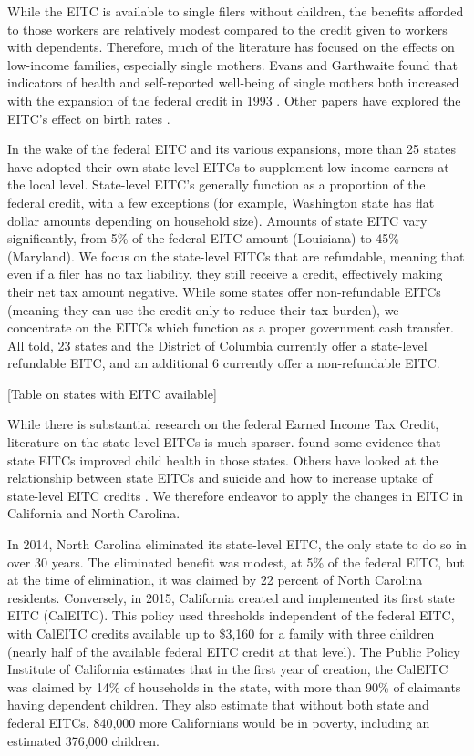 \documentclass{article}
\begin{document}
While the EITC is available to single filers without children, the benefits afforded to those workers are relatively modest compared to the credit given to workers with dependents. Therefore, much of the literature has focused on the effects on low-income families, especially single mothers. Evans and Garthwaite found that indicators of health and self-reported well-being of single mothers both increased with the expansion of the federal credit in 1993 \cite{ evans2014giving}. Other papers have explored the EITC’s effect on birth rates \cite{baughman2003did}.

In the wake of the federal EITC and its various expansions, more than 25 states have adopted their own state-level EITCs to supplement low-income earners at the local level. State-level EITC’s generally function as a proportion of the federal credit, with a few exceptions (for example, Washington state has flat dollar amounts depending on household size). Amounts of state EITC vary significantly, from 5\% of the federal EITC amount (Louisiana) to 45\% (Maryland). We focus on the state-level EITCs that are refundable, meaning that even if a filer has no tax liability, they still receive a credit, effectively making their net tax amount negative. While some states offer non-refundable EITCs (meaning they can use the credit only to reduce their tax burden), we concentrate on the EITCs which function as a proper government cash transfer. All told, 23 states and the District of Columbia currently offer a state-level refundable EITC, and an additional 6 currently offer a non-refundable EITC.

[Table on states with EITC available]

While there is substantial research on the federal Earned Income Tax Credit, literature on the state-level EITCs is much sparser. \cite{baughman2012effects} found some evidence that state EITCs improved child health in those states. Others have looked at the relationship between state EITCs and suicide \citep{lenhart2019effects} and how to increase uptake of state-level EITC credits \citep{linos2020can}. We therefore endeavor to apply the changes in EITC in California and North Carolina. 

In 2014, North Carolina eliminated its state-level EITC, the only state to do so in over 30 years. The eliminated benefit was modest, at 5\% of the federal EITC, but at the time of elimination, it was claimed by 22 percent of North Carolina residents. Conversely, in 2015, California created and implemented its first state EITC (CalEITC). This policy used thresholds independent of the federal EITC, with CalEITC credits available up to \$3,160 for a family with three children (nearly half of the available federal EITC credit at that level). The Public Policy Institute of California estimates that in the first year of creation, the CalEITC was claimed by 14\% of households in the state, with more than 90\% of claimants having dependent children. They also estimate that without both state and federal EITCs, 840,000 more Californians would be in poverty, including an estimated 376,000 children.  
\end{document}
